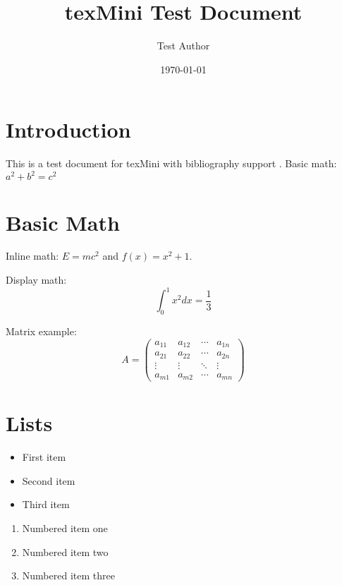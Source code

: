 \documentclass[11pt]{article}
\title{texMini Test Document}
\author{Test Author}
\date{\today}
\begin{document}
\maketitle

\section{Introduction}

This is a test document for texMini with bibliography support \cite{testwork2024}. Basic math: $a^2 + b^2 = c^2$

\section{Basic Math}

Inline math: $E = mc^2$ and $f(x) = x^2 + 1$.

Display math:
\begin{equation}
    \int_0^1 x^2 dx = \frac{1}{3}
\end{equation}

Matrix example:
\begin{equation}
    A = \begin{pmatrix}
        a_{11} & a_{12} & \cdots & a_{1n} \\
        a_{21} & a_{22} & \cdots & a_{2n} \\
        \vdots & \vdots & \ddots & \vdots \\
        a_{m1} & a_{m2} & \cdots & a_{mn}
    \end{pmatrix}
\end{equation}

\section{Lists}

\begin{itemize}
    \item First item
    \item Second item
    \item Third item
\end{itemize}

\begin{enumerate}
    \item Numbered item one
    \item Numbered item two
    \item Numbered item three
\end{enumerate}
\end{document}
